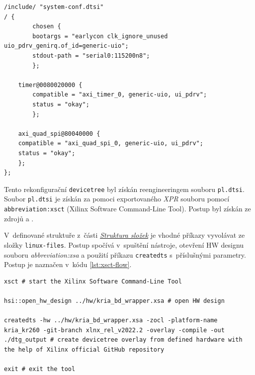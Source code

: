\documentclass[a4paper, twoside, 11pt]{article}
\begin{document}
		\begin{lstlisting}[language={devicetree}, caption={Obsah souboru system-user.dtsi, překonfigurovávající soubor system-conf.dtsi.}, label= {lst:system-user-dtsi-device-tree}]
/include/ "system-conf.dtsi"
/ {
        chosen {
        bootargs = "earlycon clk_ignore_unused   uio_pdrv_genirq.of_id=generic-uio";
        stdout-path = "serial0:115200n8";
        };

    timer@0080020000 {
        compatible = "axi_timer_0, generic-uio, ui_pdrv";
        status = "okay";
        };

    axi_quad_spi@80040000 {
    compatible = "axi_quad_spi_0, generic-uio, ui_pdrv";
    status = "okay";
    };
};\end{lstlisting}

			Tento rekonfigurační \texttt{devicetree} byl získán reengineeringem souboru \texttt{pl.dtsi}. Soubor \texttt{pl.dtsi} je získán za pomoci exportovaného \textit{XPR} souboru pomocí \texttt{\gls{abbreviation:xsct}} (Xilinx Software Command-Line Tool). Postup byl získán ze zdrojů \cite{xilinx-github-vitis-tutorials-step-2-create-the-software-components} a \cite{hackster-getting-started-with-the-kria-kr260-in-petalinux}.\par
			V~definované struktuře z~části \hyperref[sec:struktura-slozek]{\textit{Struktura složek}} je vhodné příkazy vyvolávat ze složky \texttt{linux-files}. Postup spočívá v~spuštění nástroje, otevření HW designu souboru \textit{\gls{abbreviation:xsa}} a použití příkazu \texttt{createdts} s~příslušnými parametry. Postup je naznačen v~kódu \ref{lst:xsct-flow}.\par

		\begin{lstlisting}[language={xsct}, caption={Postup tvorby pl.dtsi souboru pomoci \gls{abbreviation:xsct}, popisující devicetree v~runtime.}, label= {lst:xsct-flow}]
xsct # start the Xilinx Software Command-Line Tool

hsi::open_hw_design ../hw/kria_bd_wrapper.xsa # open HW design

createdts -hw ../hw/kria_bd_wrapper.xsa -zocl -platform-name kria_kr260 -git-branch xlnx_rel_v2022.2 -overlay -compile -out ./dtg_output # create devicetree overlay from defined hardware with the help of Xilinx official GitHub repository

exit # exit the tool\end{lstlisting}
\end{document}
